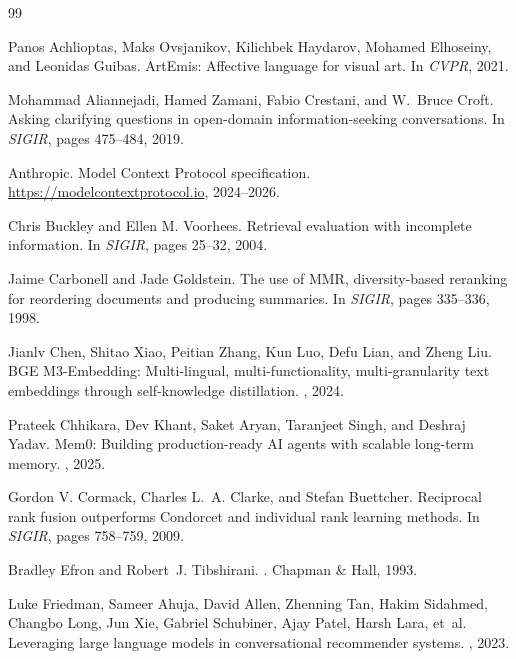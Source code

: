 \documentclass[10pt,twocolumn,letterpaper]{article}
\begin{document}
\small
\renewcommand{\refname}{참고문헌}\begin{thebibliography}{99}\setlength{\itemsep}{1pt}

Panos Achlioptas, Maks Ovsjanikov, Kilichbek Haydarov, Mohamed Elhoseiny, and Leonidas Guibas.
\newblock ArtEmis: Affective language for visual art.
\newblock In {\em CVPR}, 2021.

Mohammad Aliannejadi, Hamed Zamani, Fabio Crestani, and W.~Bruce Croft.
\newblock Asking clarifying questions in open-domain information-seeking conversations.
\newblock In {\em SIGIR}, pages 475--484, 2019.

Anthropic.
\newblock Model Context Protocol specification.
\newblock \url{https://modelcontextprotocol.io}, 2024--2026.

Chris Buckley and Ellen M. Voorhees.
\newblock Retrieval evaluation with incomplete information.
\newblock In {\em SIGIR}, pages 25--32, 2004.

Jaime Carbonell and Jade Goldstein.
\newblock The use of MMR, diversity-based reranking for reordering documents and producing summaries.
\newblock In {\em SIGIR}, pages 335--336, 1998.

Jianlv Chen, Shitao Xiao, Peitian Zhang, Kun Luo, Defu Lian, and Zheng Liu.
\newblock BGE M3-Embedding: Multi-lingual, multi-functionality, multi-granularity text embeddings through self-knowledge distillation.
, 2024.

Prateek Chhikara, Dev Khant, Saket Aryan, Taranjeet Singh, and Deshraj Yadav.
\newblock Mem0: Building production-ready AI agents with scalable long-term memory.
, 2025.

Gordon V. Cormack, Charles L.~A. Clarke, and Stefan Buettcher.
\newblock Reciprocal rank fusion outperforms Condorcet and individual rank learning methods.
\newblock In {\em SIGIR}, pages 758--759, 2009.

Bradley Efron and Robert~J. Tibshirani.
.
\newblock Chapman \& Hall, 1993.

Luke Friedman, Sameer Ahuja, David Allen, Zhenning Tan, Hakim Sidahmed, Changbo Long, Jun Xie, Gabriel Schubiner, Ajay Patel, Harsh Lara, et~al.
\newblock Leveraging large language models in conversational recommender systems.
, 2023.


\end{thebibliography}
\end{document}
